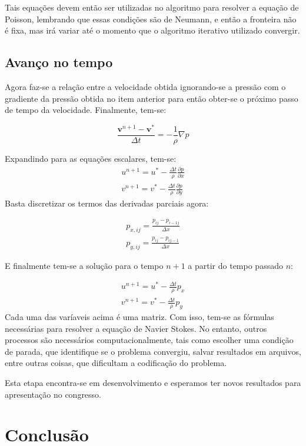 \documentclass[journal]{IEEEtran}
\begin{document}
Tais equações devem então ser utilizadas no algoritmo para resolver a equação de Poisson, lembrando que essas condições são de Neumann, e então a fronteira não é fixa, mas irá variar até o momento que o algoritmo iterativo utilizado convergir.
\subsection{Avanço no tempo}
Agora faz-se a relação entre a velocidade obtida ignorando-se a pressão com o gradiente da pressão obtida no item anterior para então obter-se o próximo passo de tempo da velocidade. Finalmente, tem-se: 

\begin{equation}
\frac{\textbf{v}^{n+1}-\textbf{v}^*}{\Delta t}=-\frac{1}{\rho}\nabla p
\end{equation}

Expandindo para as equações escalares, tem-se:
\begin{eqnarray}
u^{n+1}=u^*-\frac{\Delta t}{\rho}\frac{\partial p}{\partial x}\\
v^{n+1}=v^*-\frac{\Delta t}{\rho}\frac{\partial p}{\partial y}
\end{eqnarray}
Basta discretizar os termos das derivadas parciais agora:

\begin{eqnarray}
p_{x,ij}=\frac{p_{ij}-p_{i-1j}}{\Delta x}\\
p_{y,ij}=\frac{p_{ij}-p_{ij-1}}{\Delta x}
\end{eqnarray}

E finalmente tem-se a solução para o tempo $n+1$ a partir do tempo passado $n$:

\begin{eqnarray}
u^{n+1}=u^*-\frac{\Delta t}{\rho}p_x\\
v^{n+1}=v^*-\frac{\Delta t}{\rho}p_y
\end{eqnarray}
Cada uma das varíaveis acima é uma matriz. Com isso, tem-se as fórmulas necessárias para resolver a equação de Navier Stokes. No entanto, outros processos são necessários computacionalmente, tais  como escolher uma condição de parada, que identifique se o problema convergiu, salvar resultados em arquivos, entre outras coisas, que dificultam a codificação do problema.

Esta etapa encontra-se em desenvolvimento e esperamos ter novos resultados para apresentação no congresso.
\section{Conclusão}
\end{document}
